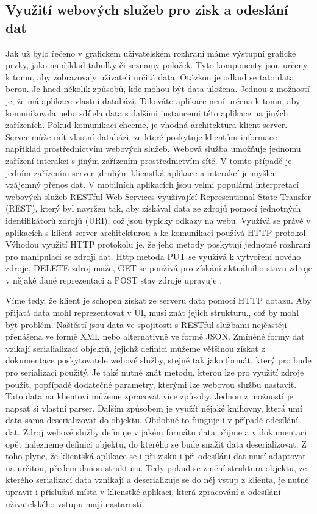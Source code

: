 \subsection{Využití webových služeb pro zisk a odeslání dat}
Jak už bylo řečeno v grafickém uživatelském rozhraní máme výstupní grafické prvky, jako například tabulky či seznamy položek. Tyto komponenty jsou určeny k tomu, aby zobrazovaly uživateli určitá data. Otázkou je odkud se tato data berou. Je hned několik způsobů, kde mohou být data uložena. Jednou z možností je, že má aplikace vlastní databázi. Takováto aplikace není určena k tomu, aby komunikovala nebo sdílela data s dalšími instancemi této aplikace na jiných zařízeních. Pokud komunikaci chceme, je vhodná architektura klient-server. Server může mít vlastní databázi, ze které poskytuje klientům informace například prostřednictvím webových služeb. Webová služba umožňuje jednomu zařízení interakci s jiným zařízením prostřednictvím sítě\cite{wiki-ws}. V tomto případě je jedním zařízením server ,druhým klienstká aplikace a interakcí je myšlen vzájemný přenos dat. V mobilních aplikacích jsou velmi populární interpretací webových služeb RESTful Web Services využívající Representional State Transfer (REST), který byl navržen tak, aby získával data ze zdrojů pomocí jednotných identifikátorů zdrojů (URI), což jsou typicky odkazy na webu. Využívá se právě v aplikacích s klient-server architekturou a ke komunikaci používá HTTP protokol. Výhodou využití HTTP protokolu je, že jeho metody poskytují jednotné rozhraní pro manipulaci se zdroji dat. Http metoda PUT se využívá k vytvoření nového zdroje, DELETE zdroj maže, GET se používá pro získání aktuálního stavu zdroje v nějaké dané reprezentaci a POST stav zdroje upravuje \cite{oracle-ws}. 

Víme tedy, že klient je schopen získat ze serveru data pomocí HTTP dotazu. Aby přijatá data mohl reprezentovat v UI, musí znát jejich strukturu., což by mohl být problém. Naštěstí jsou data ve spojitosti s RESTful službami nejčastěji přenášena ve formě XML nebo alternativně ve formě JSON\cite{ws-formats}. Zmíněné formy dat vzikají serialializací objektů, jejichž definici můžeme většinou získat z dokumentace poskytovatele webové služby, stejně tak jako formát, který pro bude pro serializaci použitý. Je také nutné znát metodu, kterou lze pro využití zdroje použít, popřípadě dodatečné parametry, kterými lze webovou službu nastavit. Tato data na klientovi můžeme zpracovat více způsoby. Jednou z možností je napsat si vlastní parser. Dalším způsobem je využít nějaké knihovny, která umí data sama deserializovat do objektu. Obdobně to funguje i v případě odesílání dat. Zdroj webové služby definuje v jakém formátu data přijme a v dokumentaci opět nalezneme definici objektu, do kterého se bude snažit data deserializovat. Z toho plyne, že klientská aplikace se i při zisku i při odesílání dat musí adaptovat na určitou, předem danou strukturu. Tedy pokud se změní struktura objektu, ze kterého serializací data vznikají a deserializuje se do něj vstup z klienta, je nutné upravit i příslušná místa v klienstké aplikaci, která zpracování a odesílání uživatelského vstupu mají nastarosti.  

